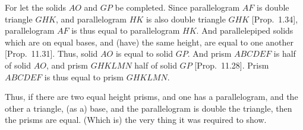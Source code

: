 \begin{Parallel}{}{}
{For let the solids $AO$ and $GP$ be completed. 
Since parallelogram $AF$ is double triangle $GHK$, and parallelogram
$HK$ is also double triangle $GHK$ [Prop.~1.34],
parallelogram $AF$ is thus equal to parallelogram $HK$. And parallelepiped
solids which are on equal bases, and (have) the same height, are equal
to one another [Prop.~11.31]. Thus, solid
$AO$ is equal to solid $GP$.  And prism $ABCDEF$ is half of solid
$AO$, and prism $GHKLMN$ half of solid $GP$ [Prop.~11.28]. Prism $ABCDEF$ is thus equal to prism $GHKLMN$.

Thus, if there are two equal height prisms,
and one has a parallelogram, and the other a triangle,  (as a) base, 
and the parallelogram is double the triangle, then the prisms are equal.
(Which is) the very thing it was required to show.}

\ParallelPar
\end{Parallel}